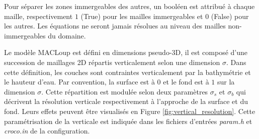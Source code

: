 \documentclass[10pt,a4paper,titlepage]{article}
\begin{document}
Pour séparer les zones immergeables des autres, un booléen est attribué à chaque maille, respectivement $1$ (True) pour les mailles immergeables et $0$ (False) pour les autres.
Les équations ne seront jamais résolues au niveau des mailles non-immergeables du domaine.

Le modèle MACLoup est défini en dimensions pseudo-3D, il est composé d'une succession de maillages 2D répartis verticalement selon une dimension $\sigma$.
Dans cette définition, les couches sont contraintes verticalement par la bathymétrie et le hauteur d'eau.
Par convention, la surface est à $0$ et le fond est à $1$ sur la dimension $\sigma$.
Cette répartition est modulée selon deux paramètres $\sigma_{s}$ et $\sigma_{b}$ qui décrivent la résolution verticale respectivement à l'approche de la surface et du fond.
Leurs effets peuvent être visualisés en Figure \ref{fig:vertical_resolution}.
Cette paramétrisation de la verticale est indiquée dans les fichiers d'entrées \textit{param.h} et \textit{croco.in} de la configuration.
\end{document}
